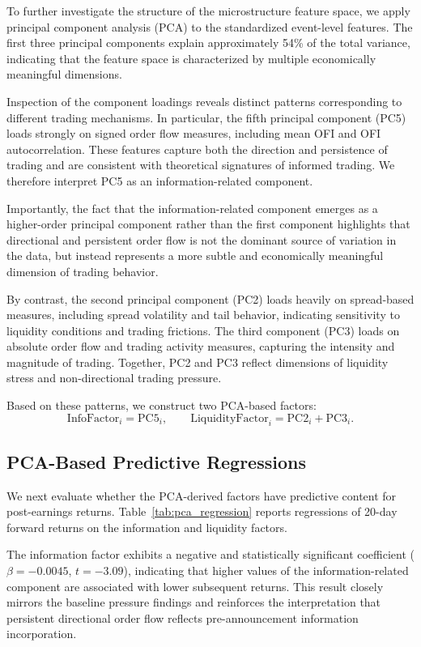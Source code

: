 To further investigate the structure of the microstructure feature space, we apply principal component analysis (PCA) to the standardized event-level features. The first three principal components explain approximately 54\% of the total variance, indicating that the feature space is characterized by multiple economically meaningful dimensions.

Inspection of the component loadings reveals distinct patterns corresponding to different trading mechanisms. In particular, the fifth principal component (PC5) loads strongly on signed order flow measures, including mean OFI and OFI autocorrelation. These features capture both the direction and persistence of trading and are consistent with theoretical signatures of informed trading. We therefore interpret PC5 as an information-related component.

Importantly, the fact that the information-related component emerges as a higher-order principal component rather than the first component highlights that directional and persistent order flow is not the dominant source of variation in the data, but instead represents a more subtle and economically meaningful dimension of trading behavior.

By contrast, the second principal component (PC2) loads heavily on spread-based measures, including spread volatility and tail behavior, indicating sensitivity to liquidity conditions and trading frictions. The third component (PC3) loads on absolute order flow and trading activity measures, capturing the intensity and magnitude of trading. Together, PC2 and PC3 reflect dimensions of liquidity stress and non-directional trading pressure.

Based on these patterns, we construct two PCA-based factors:
\begin{equation}
\text{InfoFactor}_i = \text{PC5}_i, \qquad
\text{LiquidityFactor}_i = \text{PC2}_i + \text{PC3}_i.
\end{equation}

\subsection{PCA-Based Predictive Regressions}

We next evaluate whether the PCA-derived factors have predictive content for post-earnings returns. Table~\ref{tab:pca_regression} reports regressions of 20-day forward returns on the information and liquidity factors.

The information factor exhibits a negative and statistically significant coefficient ($\beta = -0.0045$, $t = -3.09$), indicating that higher values of the information-related component are associated with lower subsequent returns. This result closely mirrors the baseline pressure findings and reinforces the interpretation that persistent directional order flow reflects pre-announcement information incorporation.


